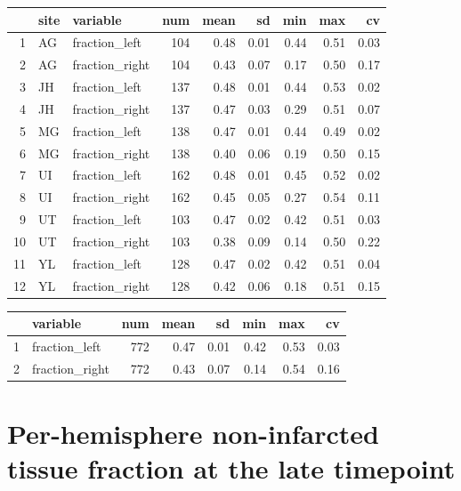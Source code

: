 \documentclass[
]{article}
\begin{document}
\begin{table}[ht]
\centering
\begin{tabular}{rllrrrrrr}
  \hline
 & site & variable & num & mean & sd & min & max & cv \\ 
  \hline
1 & AG & fraction\_left & 104 & 0.48 & 0.01 & 0.44 & 0.51 & 0.03 \\ 
  2 & AG & fraction\_right & 104 & 0.43 & 0.07 & 0.17 & 0.50 & 0.17 \\ 
  3 & JH & fraction\_left & 137 & 0.48 & 0.01 & 0.44 & 0.53 & 0.02 \\ 
  4 & JH & fraction\_right & 137 & 0.47 & 0.03 & 0.29 & 0.51 & 0.07 \\ 
  5 & MG & fraction\_left & 138 & 0.47 & 0.01 & 0.44 & 0.49 & 0.02 \\ 
  6 & MG & fraction\_right & 138 & 0.40 & 0.06 & 0.19 & 0.50 & 0.15 \\ 
  7 & UI & fraction\_left & 162 & 0.48 & 0.01 & 0.45 & 0.52 & 0.02 \\ 
  8 & UI & fraction\_right & 162 & 0.45 & 0.05 & 0.27 & 0.54 & 0.11 \\ 
  9 & UT & fraction\_left & 103 & 0.47 & 0.02 & 0.42 & 0.51 & 0.03 \\ 
  10 & UT & fraction\_right & 103 & 0.38 & 0.09 & 0.14 & 0.50 & 0.22 \\ 
  11 & YL & fraction\_left & 128 & 0.47 & 0.02 & 0.42 & 0.51 & 0.04 \\ 
  12 & YL & fraction\_right & 128 & 0.42 & 0.06 & 0.18 & 0.51 & 0.15 \\ 
   \hline
\end{tabular}
\end{table}
\begin{table}[ht]
\centering
\begin{tabular}{rlrrrrrr}
  \hline
 & variable & num & mean & sd & min & max & cv \\ 
  \hline
1 & fraction\_left & 772 & 0.47 & 0.01 & 0.42 & 0.53 & 0.03 \\ 
  2 & fraction\_right & 772 & 0.43 & 0.07 & 0.14 & 0.54 & 0.16 \\ 
   \hline
\end{tabular}
\end{table}

\hypertarget{per-hemisphere-non-infarcted-tissue-fraction-at-the-late-timepoint}{%
\section{Per-hemisphere non-infarcted tissue fraction at the late
timepoint}\label{per-hemisphere-non-infarcted-tissue-fraction-at-the-late-timepoint}}
\end{document}
